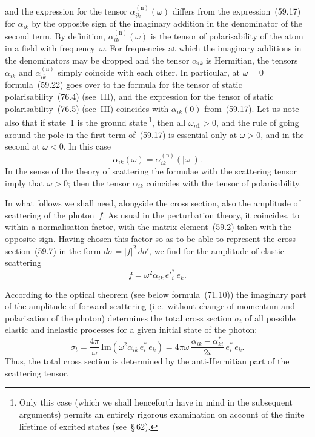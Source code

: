 and the expression for the tensor $\alpha^{(\mathrm{n})}_{ik}(\omega)$ differs from the expression~(59.17) for $\alpha_{ik}$ by the opposite sign of the imaginary addition in the denominator of the second term. By definition, $\alpha^{(\mathrm{n})}_{ik}(\omega)$ is the tensor of polarisability of the atom in a field with frequency~$\omega$. For frequencies at which the imaginary additions in the denominators may be dropped and the tensor $\alpha_{ik}$ is Hermitian, the tensors $\alpha_{ik}$ and $\alpha^{(\mathrm{n})}_{ik}$ simply coincide with each other. In particular, at $\omega = 0$ formula~(59.22) goes over to the formula for the tensor of static polarisability~(76.4) (see~III), and the expression for the tensor of static polarisability~(76.5) (see~III) coincides with $\alpha_{ik}(0)$ from~(59.17). Let us note also that if state~1 is the ground state\,\footnote{Only this case (which we shall henceforth have in mind in the subsequent arguments) permits an entirely rigorous examination on account of the finite lifetime of excited states (see~\S\,62).}, then all $\omega_{n1} > 0$, and the rule of going around the pole in the first term of~(59.17) is essential only at $\omega > 0$, and in the second at $\omega < 0$. In this case
\begin{equation}
\alpha_{ik}(\omega) = \alpha^{(\mathrm{n})}_{ik}(|\omega|).
\tag{59.23}
\end{equation}
In the sense of the theory of scattering the formulae with the scattering tensor imply that $\omega > 0$; then the tensor $\alpha_{ik}$ coincides with the tensor of polarisability.

In what follows we shall need, alongside the cross section, also the amplitude of scattering of the photon~$f$. As usual in the perturbation theory, it coincides, to within a normalisation factor, with the matrix element~(59.2) taken with the opposite sign. Having chosen this factor so as to be able to represent the cross section~(59.7) in the form $d\sigma = |f|^2\,do'$, we find for the amplitude of elastic scattering
\begin{equation}
f = \omega^2\alpha_{ik}\,e'^*_i\,e_k.
\tag{59.24}
\end{equation}

According to the optical theorem (see below formula~(71.10)) the imaginary part of the amplitude of forward scattering (i.e.\ without change of momentum and polarisation of the photon) determines the total cross section $\sigma_t$ of all possible elastic and inelastic processes for a given initial state of the photon:
\begin{equation}
\sigma_t = \frac{4\pi}{\omega}\,\mathrm{Im}(\omega^2\alpha_{ik}\,e^*_i\,e_k) = 4\pi\omega\,\frac{\alpha_{ik} - \alpha^*_{ki}}{2i}\,e^*_i\,e_k.
\tag{59.25}
\end{equation}
Thus, the total cross section is determined by the anti-Hermitian part of the scattering tensor.

